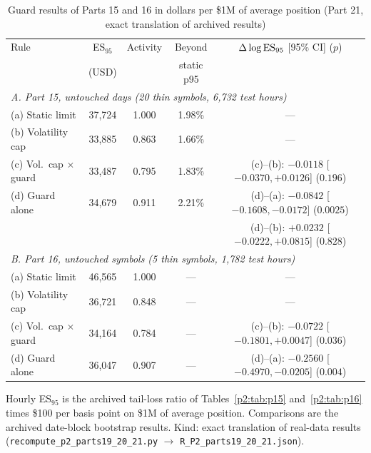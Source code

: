 \begin{table}[!tbp]\centering\footnotesize
\begin{threeparttable}
\caption{Guard results of Parts 15 and 16 in dollars per \$1M of average position (Part 21, exact translation of archived results)}\label{p2:tab:p21}
\setlength{\tabcolsep}{1.8pt}
\begin{tabular}{lcccc}
\toprule
Rule & ES$_{95}$ & Activity & Beyond & $\Delta\log{\rm ES}_{95}$ [95\% CI] ($p$)\\
 & (USD) & & static p95 & \\
\midrule
\multicolumn{5}{l}{\emph{A. Part 15, untouched days (20 thin symbols, 6{,}732 test hours)}}\\
(a) Static limit & 37{,}724 & 1.000 & 1.98\% & ---\\
(b) Volatility cap & 33{,}885 & 0.863 & 1.66\% & ---\\
(c) Vol.\ cap $\times$ guard & 33{,}487 & 0.795 & 1.83\% & (c)--(b): $-0.0118$ [$-0.0370, +0.0126$] ($0.196$)\\
(d) Guard alone & 34{,}679 & 0.911 & 2.21\% & (d)--(a): $-0.0842$ [$-0.1608, -0.0172$] ($0.0025$)\\
 & & & & (d)--(b): $+0.0232$ [$-0.0222, +0.0815$] ($0.828$)\\
\midrule
\multicolumn{5}{l}{\emph{B. Part 16, untouched symbols (5 thin symbols, 1{,}782 test hours)}}\\
(a) Static limit & 46{,}565 & 1.000 & --- & ---\\
(b) Volatility cap & 36{,}721 & 0.848 & --- & ---\\
(c) Vol.\ cap $\times$ guard & 34{,}164 & 0.784 & --- & (c)--(b): $-0.0722$ [$-0.1801, +0.0047$] ($0.036$)\\
(d) Guard alone & 36{,}047 & 0.907 & --- & (d)--(a): $-0.2560$ [$-0.4970, -0.0205$] ($0.004$)\\
\bottomrule
\end{tabular}
\begin{tablenotes}\footnotesize\item Hourly ES$_{95}$ is the archived tail-loss ratio of Tables~\ref{p2:tab:p15} and~\ref{p2:tab:p16} times \$100 per basis point on \$1M of average position. Comparisons are the archived date-block bootstrap results. Kind: exact translation of real-data results (\texttt{recompute\_p2\_parts19\_20\_21.py} $\to$ \texttt{R\_P2\_parts19\_20\_21.json}).\end{tablenotes}
\end{threeparttable}
\end{table}

